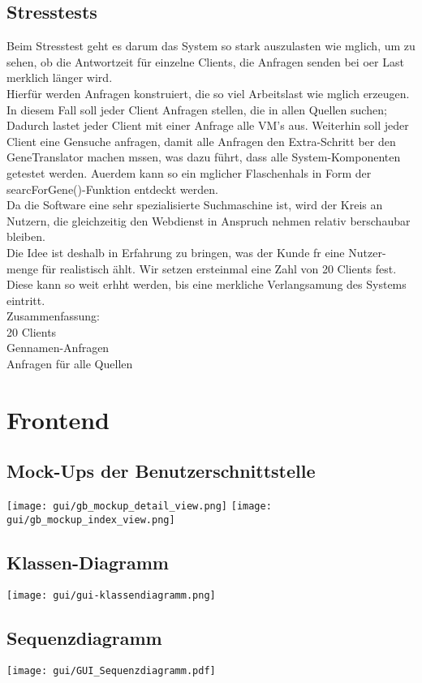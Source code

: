 \documentclass{scrartcl}
\begin{document}
\subsection{Stresstests}
Beim Stresstest geht es darum das System so stark auszulasten wie mglich, um
zu sehen, ob die Antwortzeit für einzelne Clients, die Anfragen senden bei oer
Last merklich länger wird.\\
Hierfür werden Anfragen konstruiert, die so viel Arbeitslast wie mglich erzeugen.
In diesem Fall soll jeder Client Anfragen stellen, die in allen Quellen suchen;
Dadurch lastet jeder Client mit einer Anfrage alle VM’s aus. Weiterhin soll jeder
Client eine Gensuche anfragen, damit alle Anfragen den Extra-Schritt ber den
GeneTranslator machen mssen, was dazu führt, dass alle System-Komponenten
getestet werden. Auerdem kann so ein mglicher Flaschenhals in Form der
searcForGene()-Funktion entdeckt werden.\\
Da die Software eine sehr spezialisierte Suchmaschine ist, wird der Kreis an
Nutzern, die gleichzeitig den Webdienst in Anspruch nehmen relativ berschaubar
bleiben.\\
Die Idee ist deshalb in Erfahrung zu bringen, was der Kunde fr eine Nutzer-
menge für realistisch ählt. Wir setzen ersteinmal eine Zahl von 20 Clients fest.
Diese kann so weit erhht werden, bis eine merkliche Verlangsamung des Systems
eintritt.\\
Zusammenfassung:\\
20 Clients\\
Gennamen-Anfragen\\
Anfragen für alle Quellen\\
\newpage

\section{Frontend}
\subsection{Mock-Ups der Benutzerschnittstelle}
\texttt{[image: gui/gb\_mockup\_detail\_view.png]}
\texttt{[image: gui/gb\_mockup\_index\_view.png]}
\subsection{Klassen-Diagramm}
\texttt{[image: gui/gui-klassendiagramm.png]}
\subsection{Sequenzdiagramm}
\texttt{[image: gui/GUI\_Sequenzdiagramm.pdf]}
\end{document}
